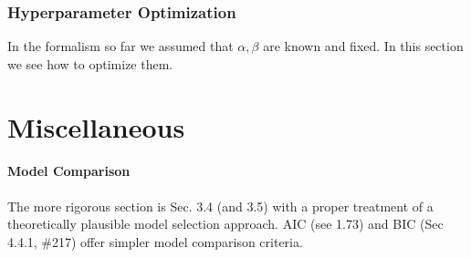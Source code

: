 \documentclass[a4paper]{article}
\begin{document}
\subsubsection{Hyperparameter Optimization}
In the formalism so far we assumed that $\alpha, \beta$ are known and fixed. In this section we see how to optimize them. 


















\clearpage
\newpage



\section*{Miscellaneous}
\paragraph*{Model Comparison} The more rigorous section is Sec. 3.4 (and 3.5) with a proper treatment of a theoretically plausible model selection approach. AIC (see 1.73) and BIC (Sec 4.4.1, \#217) offer simpler model comparison criteria.







\end{document}
